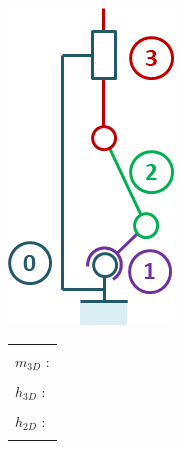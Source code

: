 \documentclass[10pt,fleqn]{article} %
\begin{document}
\begin{multicols}{2}
\begin{minipage}[c]{.45\linewidth}
\begin{center}
\includegraphics[width=.8\linewidth]{images/cas_08.png}
\end{center}
\end{minipage} \hfill
\begin{minipage}[c]{.5\linewidth}
\begin{center}
\begin{tabular}{|p{3cm}|}
\hline 
\\
$m_{3D}$ : \\
\\
$h_{3D}$ : \\
\\
$h_{2D}$ : \\
\\
\hline
\end{tabular}
\end{center}
\end{minipage}



\end{multicols}
\end{document}
